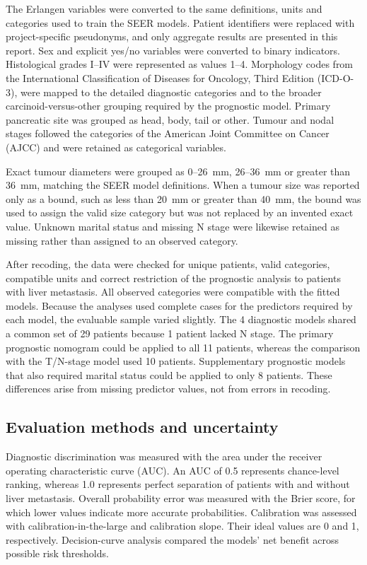The Erlangen variables were converted to the same definitions, units and
categories used to train the SEER models. Patient identifiers were replaced with
project-specific pseudonyms, and only aggregate results are presented in this
report. Sex and explicit yes/no variables were converted to binary indicators.
Histological grades I--IV were represented as values 1--4. Morphology codes from
the International Classification of Diseases for Oncology, Third Edition
(ICD-O-3), were mapped to the detailed diagnostic categories and to the broader
carcinoid-versus-other grouping required by the prognostic model. Primary
pancreatic site was grouped as head, body, tail or other. Tumour and nodal stages
followed the categories of the American Joint Committee on Cancer (AJCC) and were
retained as categorical variables.

Exact tumour diameters were grouped as 0--26~mm, 26--36~mm or greater than
36~mm, matching the SEER model definitions. When a tumour size was reported only
as a bound, such as less than 20~mm or greater than 40~mm, the bound was used to
assign the valid size category but was not replaced by an invented exact value.
Unknown marital status and missing N stage were likewise retained as missing
rather than assigned to an observed category.

After recoding, the data were checked for unique patients, valid categories,
compatible units and correct restriction of the prognostic analysis to patients
with liver metastasis. All observed categories were compatible with the fitted
models. Because the analyses used complete cases for the predictors required by
each model, the evaluable sample varied slightly. The 4 diagnostic models shared
a common set of 29 patients because 1 patient lacked N stage. The primary
prognostic nomogram could be applied to all 11 patients, whereas the comparison
with the T/N-stage model used 10 patients. Supplementary prognostic models that
also required marital status could be applied to only 8 patients. These
differences arise from missing predictor values, not from errors in recoding.

\subsection{Evaluation methods and uncertainty}
\label{sec:external-validation:methods}

Diagnostic discrimination was measured with the area under the receiver
operating characteristic curve (AUC). An AUC of 0.5 represents chance-level
ranking, whereas 1.0 represents perfect separation of patients with and without
liver metastasis. Overall probability error was measured with the Brier score,
for which lower values indicate more accurate probabilities. Calibration was
assessed with calibration-in-the-large and calibration slope. Their ideal values
are 0 and 1, respectively. Decision-curve analysis compared the models' net
benefit across possible risk thresholds.

